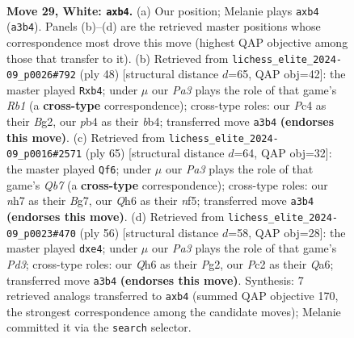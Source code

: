 \documentclass[11pt]{article}
\begin{document}
\clearpage

\begin{figure}[p]\centering
\begin{subfigure}{0.46\textwidth}\centering
\resizebox{\linewidth}{!}{%
\newchessgame
\chessboard[
  setfen={4r2k/p1ppq2n/5p1Q/8/1pPP4/P7/2P2P1P/1R4K1 w - - 3 29},
  showmover=false,
  pgfstyle=straightmove, color=movearrow, markmove={a3-b4}
]}
\caption{}
\end{subfigure}\hfill
\begin{subfigure}{0.46\textwidth}\centering
\resizebox{\linewidth}{!}{%
\newchessgame
\chessboard[
  setfen={2kq3r/1p3pn1/2p5/4Q2p/Pb6/6P1/4PPB1/1R4K1 w - - 0 25},
  showmover=false,
  pgfstyle=straightmove, color=movearrow, markmove={b1-b4}
]}
\caption{}
\end{subfigure}
\\[4pt]
\begin{subfigure}{0.46\textwidth}\centering
\resizebox{\linewidth}{!}{%
\newchessgame
\chessboard[
  setfen={4r1k1/2p2pb1/7p/p4N2/6Q1/Pp4PP/1q4P1/3R3K b - - 1 33},
  showmover=false,
  pgfstyle=straightmove, color=movearrow, markmove={b2-f6}
]}
\caption{}
\end{subfigure}\hfill
\begin{subfigure}{0.46\textwidth}\centering
\resizebox{\linewidth}{!}{%
\newchessgame
\chessboard[
  setfen={4r3/3q2kp/Q2p2p1/8/4p3/3P4/PP4PP/4R1K1 w - - 0 29},
  showmover=false,
  pgfstyle=straightmove, color=movearrow, markmove={d3-e4}
]}
\caption{}
\end{subfigure}
\caption{\textbf{Move 29, White: \texttt{axb4}.} (a) Our position; Melanie plays \texttt{axb4} (\texttt{a3b4}). Panels (b)--(d) are the retrieved master positions whose correspondence most drove this move (highest QAP objective among those that transfer to it). (b) Retrieved from \texttt{lichess\_elite\_2024-09\_p0026\#792} (ply 48) [structural distance $d$=65, QAP obj=42]: the master played \texttt{Rxb4}; under $\mu$ our \emph{Pa3} plays the role of that game's \emph{Rb1} (a \textbf{cross-type} correspondence); cross-type roles: our \emph{P}c4 as their \emph{B}g2, our \emph{p}b4 as their \emph{b}b4; transferred move \texttt{a3b4} \textbf{(endorses this move)}. (c) Retrieved from \texttt{lichess\_elite\_2024-09\_p0016\#2571} (ply 65) [structural distance $d$=64, QAP obj=32]: the master played \texttt{Qf6}; under $\mu$ our \emph{Pa3} plays the role of that game's \emph{Qb7} (a \textbf{cross-type} correspondence); cross-type roles: our \emph{n}h7 as their \emph{B}g7, our \emph{Q}h6 as their \emph{n}f5; transferred move \texttt{a3b4} \textbf{(endorses this move)}. (d) Retrieved from \texttt{lichess\_elite\_2024-09\_p0023\#470} (ply 56) [structural distance $d$=58, QAP obj=28]: the master played \texttt{dxe4}; under $\mu$ our \emph{Pa3} plays the role of that game's \emph{Pd3}; cross-type roles: our \emph{Q}h6 as their \emph{P}g2, our \emph{P}c2 as their \emph{Q}a6; transferred move \texttt{a3b4} \textbf{(endorses this move)}. Synthesis: 7 retrieved analogs transferred to \texttt{axb4} (summed QAP objective 170, the strongest correspondence among the candidate moves); Melanie committed it via the \texttt{search} selector.}
\label{fig:thought-m56}
\end{figure}
\end{document}
